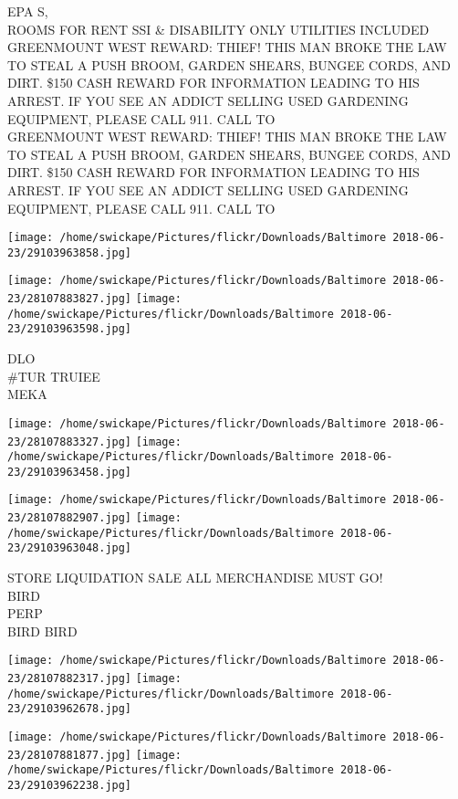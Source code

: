 \documentclass[10pt,letterpaper]{article}
\begin{document}
EPA S,\\
ROOMS FOR RENT SSI \& DISABILITY ONLY UTILITIES INCLUDED\\
GREENMOUNT WEST REWARD: THIEF!  THIS MAN BROKE THE LAW TO STEAL A PUSH BROOM, GARDEN SHEARS, BUNGEE CORDS, AND DIRT.  \$150 CASH REWARD FOR INFORMATION LEADING TO HIS ARREST.  IF YOU SEE AN ADDICT SELLING USED GARDENING EQUIPMENT, PLEASE CALL 911.  CALL TO\\
GREENMOUNT WEST REWARD: THIEF!  THIS MAN BROKE THE LAW TO STEAL A PUSH BROOM, GARDEN SHEARS, BUNGEE CORDS, AND DIRT.  \$150 CASH REWARD FOR INFORMATION LEADING TO HIS ARREST.  IF YOU SEE AN ADDICT SELLING USED GARDENING EQUIPMENT, PLEASE CALL 911.  CALL TO\\
\pagebreak

\texttt{[image: /home/swickape/Pictures/flickr/Downloads/Baltimore 2018-06-23/29103963858.jpg]}

\vspace{0.25in}
\texttt{[image: /home/swickape/Pictures/flickr/Downloads/Baltimore 2018-06-23/28107883827.jpg]}
\texttt{[image: /home/swickape/Pictures/flickr/Downloads/Baltimore 2018-06-23/29103963598.jpg]}

DLO\\
\#TUR TRUIEE\\
MEKA\\
\pagebreak

\texttt{[image: /home/swickape/Pictures/flickr/Downloads/Baltimore 2018-06-23/28107883327.jpg]}
\texttt{[image: /home/swickape/Pictures/flickr/Downloads/Baltimore 2018-06-23/29103963458.jpg]}

\texttt{[image: /home/swickape/Pictures/flickr/Downloads/Baltimore 2018-06-23/28107882907.jpg]}
\texttt{[image: /home/swickape/Pictures/flickr/Downloads/Baltimore 2018-06-23/29103963048.jpg]}

STORE LIQUIDATION SALE ALL MERCHANDISE MUST GO!\\
BIRD\\
PERP\\
BIRD BIRD\\
\pagebreak

\texttt{[image: /home/swickape/Pictures/flickr/Downloads/Baltimore 2018-06-23/28107882317.jpg]}
\texttt{[image: /home/swickape/Pictures/flickr/Downloads/Baltimore 2018-06-23/29103962678.jpg]}

\texttt{[image: /home/swickape/Pictures/flickr/Downloads/Baltimore 2018-06-23/28107881877.jpg]}
\texttt{[image: /home/swickape/Pictures/flickr/Downloads/Baltimore 2018-06-23/29103962238.jpg]}
\end{document}
